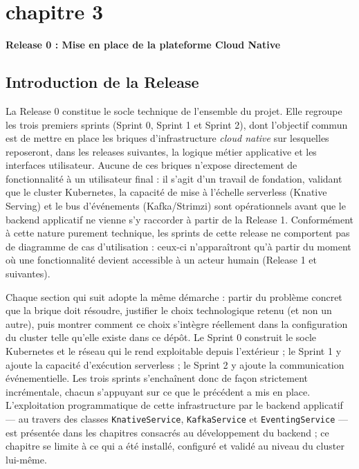 \chapter*{chapitre 3}

\textbf{\Huge Release 0 : Mise en place de la plateforme Cloud Native}

\setcounter{chapter}{3}
\setcounter{section}{0}

\section{Introduction de la Release}

La Release 0 constitue le socle technique de l'ensemble du projet. Elle regroupe les trois premiers sprints (Sprint 0, Sprint 1 et Sprint 2), dont l'objectif commun est de mettre en place les briques d'infrastructure \textit{cloud native} sur lesquelles reposeront, dans les releases suivantes, la logique métier applicative et les interfaces utilisateur. Aucune de ces briques n'expose directement de fonctionnalité à un utilisateur final : il s'agit d'un travail de fondation, validant que le cluster Kubernetes, la capacité de mise à l'échelle serverless (Knative Serving) et le bus d'événements (Kafka/Strimzi) sont opérationnels avant que le backend applicatif ne vienne s'y raccorder à partir de la Release 1. Conformément à cette nature purement technique, les sprints de cette release ne comportent pas de diagramme de cas d'utilisation : ceux-ci n'apparaîtront qu'à partir du moment où une fonctionnalité devient accessible à un acteur humain (Release 1 et suivantes).

Chaque section qui suit adopte la même démarche : partir du problème concret que la brique doit résoudre, justifier le choix technologique retenu (et non un autre), puis montrer comment ce choix s'intègre réellement dans la configuration du cluster telle qu'elle existe dans ce dépôt. Le Sprint 0 construit le socle Kubernetes et le réseau qui le rend exploitable depuis l'extérieur ; le Sprint 1 y ajoute la capacité d'exécution serverless ; le Sprint 2 y ajoute la communication événementielle. Les trois sprints s'enchaînent donc de façon strictement incrémentale, chacun s'appuyant sur ce que le précédent a mis en place. L'exploitation programmatique de cette infrastructure par le backend applicatif — au travers des classes \texttt{KnativeService}, \texttt{KafkaService} et \texttt{EventingService} — est présentée dans les chapitres consacrés au développement du backend ; ce chapitre se limite à ce qui a été installé, configuré et validé au niveau du cluster lui-même.

